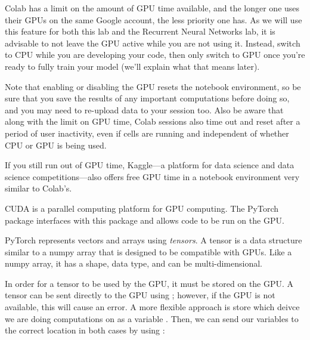 \begin{warn}
Colab has a limit on the amount of GPU time available, and the longer one uses their GPUs on the same Google account, the less priority one has.
As we will use this feature for both this lab and the Recurrent Neural Networks lab, it is advisable to not leave the GPU active while you are not using it.
Instead, switch to CPU while you are developing your code, then only switch to GPU once you're ready to fully train your model (we'll explain what that means later).

Note that enabling or disabling the GPU resets the notebook environment, so be sure that you save the results of any important computations before doing so, and you may need to re-upload data to your session too.
Also be aware that along with the limit on GPU time, Colab sessions also time out and reset after a period of user inactivity, even if cells are running and independent of whether CPU or GPU is being used.

If you still run out of GPU time, Kaggle---a platform for data science and data science competitions---also offers free GPU time in a notebook environment very similar to Colab's.
\end{warn}

CUDA is a parallel computing platform %
 for GPU computing.
 The PyTorch package  interfaces with this package and allows code to be run on the GPU.

PyTorch represents vectors and arrays using \emph{tensors}.
A tensor is a data structure similar to a numpy array that is designed to be compatible with GPUs.
Like a numpy array, it has a shape, data type, and can be multi-dimensional.

In order for a tensor to be used by the GPU, it must be stored on the GPU.
A tensor can be sent directly to the GPU using ; however, if the GPU is not available, this will cause an error.
A more flexible approach is store which deivce we are doing computations on as a variable .
Then, we can send our variables to the correct location in both cases by using :

